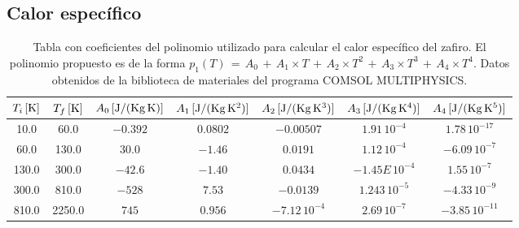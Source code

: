 \subsection*{Calor específico}
\begin{table}[h!]
  \hspace{-1.6cm}
  \begin{tabular}{|c|c|c|c|c|c|c|}\hline
$T_{i}\,[\rm K]$	&	$T_{f}\,[\rm K]$	&	$A_0\,[\rm J/(\rm Kg\,K)]$	&	$A_1\,[\rm J/(\rm Kg\,K^2)]$	&	$A_2\,[\rm J/(\rm Kg\,K^3)]$	&	$A_3\,[\rm J/(\rm Kg\,K^4)]$	&	$A_4\,[\rm J/(\rm Kg\,K^5)]$	\\ \hline
10.0	&	60.0	&$	-0.392	$&$	0.0802	$&$	-0.00507	$&$	1.91\,10^{-4}	$&$	1.78\,10^{-17}	$\\ \hline
60.0	&	130.0	&$	30.0	$&$	-1.46	$&$	0.0191	$&$	1.12\,10^{-4}	$&$	-6.09\,10^{-7}	$\\ \hline
130.0	&	300.0	&$	-42.6	$&$	-1.40	$&$	0.0434	$&$	-1.45E\,10^{-4}	$&$	1.55\,10^{-7}	$\\ \hline
300.0	&	810.0	&$	-528	$&$	7.53	$&$	-0.0139	$&$	1.243\,10^{-5}	$&$	-4.33\,10^{-9}	$\\ \hline
810.0	&	2250.0	&$	745	$&$	0.956	$&$	-7.12\,10^{-4}	$&$	2.69\,10^{-7}	$&$	-3.85\,10^{-11}	$\\ \hline
  \end{tabular}
  \caption[Tabla con coeficientes del polinomio utilizado para calcular el calor específico del zafiro.]{Tabla con coeficientes del polinomio utilizado para calcular el calor específico del zafiro. El polinomio propuesto es de la forma $p_1(T) \,=\, A_0\,+\,A_1 \times T\,+\,A_2 \times T^2\,+\,A_3 \times T^3\,+\,A_4 \times T^4$. Datos obtenidos de la biblioteca de materiales del programa COMSOL MULTIPHYSICS.}
  \label{tab:czaf}
\end{table}

